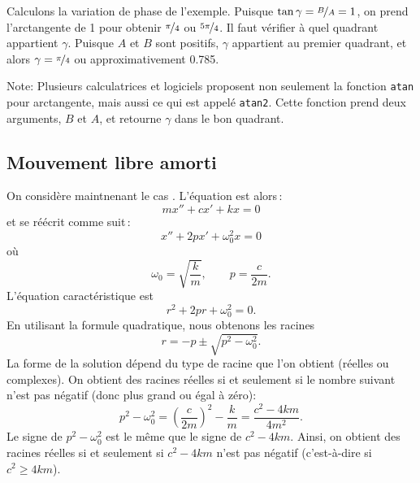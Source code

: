 Calculons la variation de phase de l'exemple.
Puisque $\tan \gamma = \nicefrac{B}{A} = 1$, on prend l'arctangente de 1 pour obtenir $\nicefrac{\pi}{4}$ ou $\nicefrac{5\pi}{4}$. 
Il faut vérifier à quel quadrant appartient $\gamma$.
Puisque  $A$ et $B$ sont positifs, $\gamma$ appartient au premier quadrant, et alors $\gamma =
\nicefrac{\pi}{4}$ ou approximativement 0.785.

Note: Plusieurs calculatrices et logiciels proposent non seulement la fonction 
\texttt{atan} pour arctangente, mais aussi ce qui est appelé  \texttt{atan2}.
Cette fonction prend deux arguments, $B$ et $A$, et retourne $\gamma$ dans le bon quadrant.

\subsection{Mouvement libre amorti}


On considère maintnenant le cas .  L'équation est alors\,: 
\begin{equation*}
m x'' + c x' + kx = 0
\end{equation*}
et se réécrit comme suit\,: 
\begin{equation*}
x'' + 2p x' + \omega_0^2 x = 0
\end{equation*}
où
\begin{equation*}
\omega_0 = \sqrt{\frac{k}{m}}, \qquad p = \frac{c}{2m} .
\end{equation*}
L'équation caractéristique est
\begin{equation*}
r^2 + 2 pr + \omega_0^2 = 0 .
\end{equation*}
En utilisant la formule quadratique, nous obtenons les racines 
\begin{equation*}
r = -p \pm \sqrt{p^2 - \omega_0^2} .
\end{equation*}
La forme de la solution dépend du type de racine que l'on obtient (réelles ou complexes). 
On obtient des racines réelles si et seulement si le nombre suivant n'est pas négatif (donc plus grand ou égal à zéro): 
\begin{equation*}
p^2 - \omega_0^2 = {\left( \frac{c}{2m} \right)}^2 - \frac{k}{m}
= \frac{c^2 - 4km}{4m^2} .
\end{equation*}
Le signe de $p^2-\omega_0^2$ est le même que le signe de
$c^2 - 4km$.  Ainsi, on obtient des racines réelles si et seulement si  $c^2-4km$ n'est pas négatif (c'est-à-dire si $c^2 \geq 4km$).

